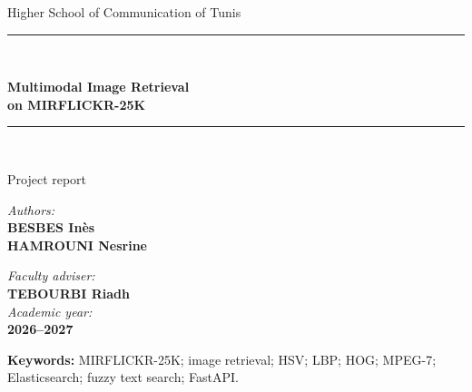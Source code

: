 \documentclass[12pt,a4paper]{article}
\begin{document}
\begin{titlepage}
\centering
\vspace*{1.5cm}
{\Large Higher School of Communication of Tunis\par}
\vspace{2cm}
\rule{\linewidth}{0.6mm}\\[0.4cm]
{\huge\bfseries Multimodal Image Retrieval\\on MIRFLICKR-25K\par}
\rule{\linewidth}{0.6mm}\\[2cm]
{\large Project report\par}
\vfill
\begin{minipage}{0.46\textwidth}
\begin{flushleft}\large
\emph{Authors:}\\
\textbf{BESBES In\`es}\\
\textbf{HAMROUNI Nesrine}
\end{flushleft}
\end{minipage}
\hfill
\begin{minipage}{0.46\textwidth}
\begin{flushright}\large
\emph{Faculty adviser:}\\
\textbf{TEBOURBI Riadh}\\[0.5cm]
\emph{Academic year:}\\
\textbf{2026--2027}
\end{flushright}
\end{minipage}
\end{titlepage}

\begin{abstract}
This report presents a multimodal image retrieval system whose primary collection
is MIRFLICKR-25K. It supports visual search from an image, text search over
per-image Flickr tags and topic annotations, and combined image--text search.
The required visual pipeline computes HSV color, LBP texture, HOG shape, and
three MPEG-7 descriptors (CLD, EHD, and SCD). ResNet-18 is an optional
experimental extension in the implementation and is outside the report's
required descriptor scope.
FastAPI serves the application, Elasticsearch indexes text metadata, and
Reciprocal Rank Fusion combines independent text and image lists for OR queries.

The visual index contains 25,000 images and 25,000 signatures for each of the
six required descriptor keys. Text ingestion stores Flickr tags together with
supplied topic annotations. Image-only, text-only, and combined paths have been
checked. These checks confirm that the pipeline runs; they are not a
quantitative evaluation of retrieval quality. Formal precision and recall
measurements on MIRFLICKR annotations remain future work.
\end{abstract}
\noindent\textbf{Keywords:} MIRFLICKR-25K; image retrieval; HSV; LBP; HOG;
MPEG-7; Elasticsearch; fuzzy text search; FastAPI.
\end{document}
